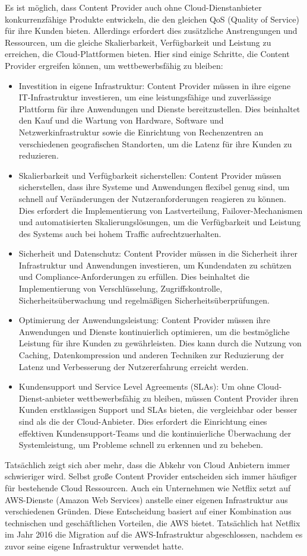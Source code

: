 \documentclass[../vs-script-first-v01.tex]{subfiles}
\begin{document}
Es ist möglich, dass Content Provider auch ohne Cloud-Dienstanbieter konkurrenzfähige Produkte entwickeln, die den gleichen QoS (Quality of Service) für ihre Kunden bieten. Allerdings erfordert dies zusätzliche Anstrengungen und Ressourcen, um die gleiche Skalierbarkeit, Verfügbarkeit und Leistung zu erreichen, die Cloud-Plattformen bieten. Hier sind einige Schritte, die Content Provider ergreifen können, um wettbewerbsfähig zu bleiben:
\begin{itemize}
\item Investition in eigene Infrastruktur: Content Provider müssen in ihre eigene IT-Infrastruktur investieren, um eine leistungsfähige und zuverlässige Plattform für ihre Anwendungen und Dienste bereitzustellen. Dies beinhaltet den Kauf und die Wartung von Hardware, Software und Netzwerkinfrastruktur sowie die Einrichtung von Rechenzentren an verschiedenen geografischen Standorten, um die Latenz für ihre Kunden zu reduzieren.
\item Skalierbarkeit und Verfügbarkeit sicherstellen: Content Provider müssen sicherstellen, dass ihre Systeme und Anwendungen flexibel genug sind, um schnell auf Veränderungen der Nutzeranforderungen reagieren zu können. Dies erfordert die Implementierung von Lastverteilung, Failover-Mechanismen und automatisierten Skalierungslösungen, um die Verfügbarkeit und Leistung des Systems auch bei hohem Traffic aufrechtzuerhalten.
\item Sicherheit und Datenschutz: Content Provider müssen in die Sicherheit ihrer Infrastruktur und Anwendungen investieren, um Kundendaten zu schützen und Compliance-Anforderungen zu erfüllen. Dies beinhaltet die Implementierung von Verschlüsselung, Zugriffskontrolle, Sicherheitsüberwachung und regelmäßigen Sicherheitsüberprüfungen.
\item Optimierung der Anwendungsleistung: Content Provider müssen ihre Anwendungen und Dienste kontinuierlich optimieren, um die bestmögliche Leistung für ihre Kunden zu gewährleisten. Dies kann durch die Nutzung von Caching, Datenkompression und anderen Techniken zur Reduzierung der Latenz und Verbesserung der Nutzererfahrung erreicht werden.
\item Kundensupport und Service Level Agreements (SLAs): Um ohne Cloud-Dienst-anbieter wettbewerbsfähig zu bleiben, müssen Content Provider ihren Kunden erstklassigen Support und SLAs bieten, die vergleichbar oder besser sind als die der Cloud-Anbieter. Dies erfordert die Einrichtung eines effektiven Kundensupport-Teams und die kontinuierliche Überwachung der Systemleistung, um Probleme schnell zu erkennen und zu beheben.
\end{itemize}
Tatsächlich zeigt sich aber mehr, dass die Abkehr von Cloud Anbietern immer schwieriger wird. Selbst große Content Provider entscheiden sich immer häufiger für bestehende Cloud Ressourcen. Auch ein Unternehmen wie Netflix setzt auf AWS-Dienste (Amazon Web Services) anstelle einer eigenen Infrastruktur aus verschiedenen Gründen. Diese Entscheidung basiert auf einer Kombination aus technischen und geschäftlichen Vorteilen, die AWS bietet. Tatsächlich hat Netflix im Jahr 2016 die Migration auf die AWS-Infrastruktur abgeschlossen, nachdem es zuvor seine eigene Infrastruktur verwendet hatte. 
\end{document}

